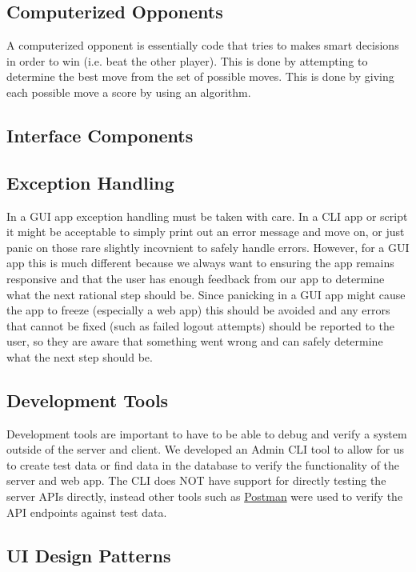 \documentclass{article}
\begin{document}
\subsection{Computerized Opponents}
A computerized opponent is essentially code that tries to makes smart decisions in order to win (i.e. beat the other player). This is done by attempting to determine the best move from the set of possible moves. This is done by giving each possible move a score by using an algorithm. 



\subsection{Interface Components}

\subsection{Exception Handling}

In a GUI app exception handling must be taken with care.
In a CLI app or script it might be acceptable to simply print out an error message and move on, or just panic on those rare slightly incovnient to safely handle errors.
However, for a GUI app this is much different because we always want to ensuring the app remains responsive and that the user has enough feedback from our app to determine what the next rational step should be.
Since panicking in a GUI app might cause the app to freeze (especially a web app) this should be avoided and any errors that cannot be fixed (such as failed logout attempts) should be reported to the user, so they are aware that something went wrong and can safely determine what the next step should be. 

\subsection{Development Tools}

Development tools are important to have to be able to debug and verify a system outside of the server and client.  We developed an Admin CLI tool to allow for us to create test data or find data in the database to verify the functionality of the server and web app.
The CLI does NOT have support for directly testing the server APIs directly, instead other tools such as \href{https://www.postman.com}{Postman} were used to verify the API endpoints against test data.

\subsection{UI Design Patterns}
\end{document}
